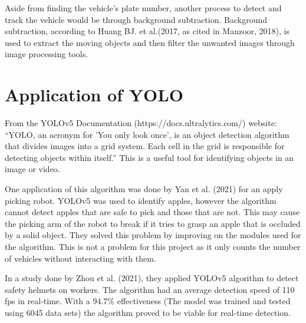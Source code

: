 	Aside from finding the vehicle’s plate number, another process to detect and track the vehicle would be through background subtraction. Background subtraction, according to Huang BJ. et al.(2017, as cited in Manzoor, 2018), is used to extract the moving objects and then filter the unwanted images through image processing tools. 


\section{Application of YOLO}
From the YOLOv5 Documentation (https://docs.ultralytics.com/) website:  “YOLO, an acronym for 'You only look once', is an object detection algorithm that divides images into a grid system. Each cell in the grid is responsible for detecting objects within itself.” This is a useful tool for identifying objects in an image or video.

One application of this algorithm was done by Yan et al. (2021) for an apply picking robot. YOLOv5 was used to identify apples, however the algorithm cannot detect apples that are safe to pick and those that are not. This may cause the picking arm of the robot to break if it tries to grasp an apple that is occluded by a solid object. They solved this problem by improving on the modules used for the algorithm. This is not a problem for this project as it only counts the number of vehicles without interacting with them. 

In a study done by Zhou et al. (2021), they applied YOLOv5 algorithm to detect safety helmets on workers. The algorithm had an average detection speed of 110 fps in real-time. With a 94.7\% effectiveness (The model was trained and tested  using 6045 data sets) the algorithm proved to be viable for real-time detection.









